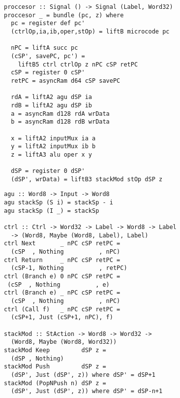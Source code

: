 \documentclass[preprint]{sigplanconf}
\begin{document}
\begin{lstlisting}
proccesor :: Signal () -> Signal (Label, Word32)
proccesor _ = bundle (pc, z) where
  pc = register def pc'
  (ctrlOp,ia,ib,oper,stOp) = liftB microcode pc

  nPC = liftA succ pc
  (cSP', savePC, pc') = 
    liftB5 ctrl ctrlOp z nPC cSP retPC
  cSP = register 0 cSP'
  retPC = asyncRam d64 cSP savePC

  rdA = liftA2 agu dSP ia
  rdB = liftA2 agu dSP ib
  a = asyncRam d128 rdA wrData
  b = asyncRam d128 rdB wrData

  x = liftA2 inputMux ia a
  y = liftA2 inputMux ib b
  z = liftA3 alu oper x y

  dSP = register 0 dSP'
  (dSP', wrData) = liftB3 stackMod stOp dSP z
\end{lstlisting}

\begin{lstlisting}
agu :: Word8 -> Input -> Word8
agu stackSp (S i) = stackSp - i
agu stackSp (I _) = stackSp

ctrl :: Ctrl -> Word32 -> Label -> Word8 -> Label
  -> (Word8, Maybe (Word8, Label), Label)
ctrl Next       _ nPC cSP retPC =
  (cSP  , Nothing          , nPC)
ctrl Return     _ nPC cSP retPC =
  (cSP-1, Nothing          , retPC)
ctrl (Branch e) 0 nPC cSP retPC =
 (cSP  , Nothing          , e)
ctrl (Branch e) _ nPC cSP retPC =
  (cSP  , Nothing          , nPC)
ctrl (Call f)   _ nPC cSP retPC =
  (cSP+1, Just (cSP+1, nPC), f)

stackMod :: StAction -> Word8 -> Word32 ->
  (Word8, Maybe (Word8, Word32))
stackMod Keep         dSP z =
  (dSP , Nothing)
stackMod Push         dSP z =
  (dSP', Just (dSP', z)) where dSP' = dSP+1
stackMod (PopNPush n) dSP z =
  (dSP', Just (dSP', z)) where dSP' = dSP-n+1
\end{lstlisting}
\end{document}
